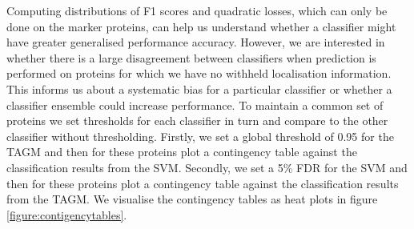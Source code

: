 \documentclass[12pt,english]{article}\usepackage[]{graphicx}\usepackage[]{color}
\begin{document}
Computing distributions of F1 scores and quadratic losses, which can only be done
on the marker proteins, can help us
understand whether a classifier might have greater generalised
performance accuracy. However, we are interested in whether there is a
large disagreement between classifiers when prediction is performed on
proteins for which we have no withheld localisation information. This
informs us about a systematic bias for a particular classifier or
whether a classifier ensemble could increase performance. To maintain
a common set of proteins we set thresholds for each classifier in turn
and compare to the other classifier without thresholding. Firstly, we
set a global threshold of 0.95 for the TAGM and then for these
proteins plot a contingency table against the classification results
from the SVM. Secondly, we set a 5\% FDR for the SVM and then for
these proteins plot a contingency table against the classification
results from the TAGM. We visualise the contingency tables as heat
plots in figure \ref{figure:contigencytables}.
\end{document}
